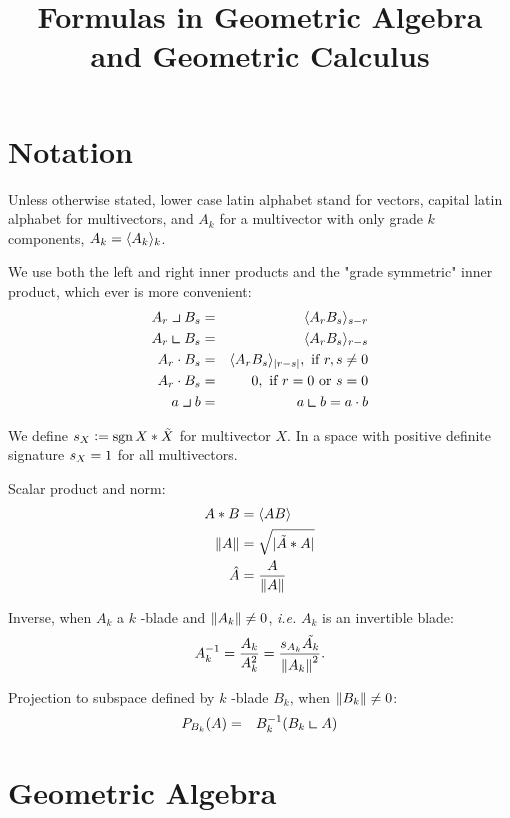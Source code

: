 \documentclass[a4paper,12pt]{article}
\title{Formulas in Geometric Algebra and Geometric Calculus}
\author{}
\begin{document}
\maketitle

\section{Notation}

Unless otherwise stated, lower case latin alphabet stand for vectors, capital latin alphabet for multivectors, and $A_k$ for a multivector with only grade $k$ components, $A_k = \grade{k}{A_k}$.

We use both the left and right inner products and the "grade symmetric" inner product, which ever is more convenient:
\begin{eqnarray}
A_r \linner B_s &=& \grade{s-r}{A_r B_s}\\
A_r \rinner B_s &=& \grade{r-s}{A_r B_s}\\
A_r \cdot B_s &=& \grade{\abs{r-s}}{A_r B_s},\ \textrm{if}\ r, s \neq 0\\
A_r \cdot B_s &=& 0,\ \textrm{if}\ r = 0\ \textrm{or}\ s = 0\\
a \linner b &=& a \rinner b = a \cdot b
\end{eqnarray}

We define $\signX{X} := \sign{X * \reverse{X}}$ for multivector $X$.
In a space with positive definite signature $\signX{X} = 1$ for all multivectors.

Scalar product and norm:
\begin{align}
 A * B &= \grade{}{AB}\\
 \norm{A} &= \sqrt{|\reverse{A} * A|}\\
 \normed{A} &= \frac{A}{\norm{A}}
\end{align}

Inverse, when $A_k$ a $k$ -blade and $\norm{A_k} \neq 0$, \emph{i.e.} $A_k$ is an invertible blade:
\begin{equation}
\label{eq:inversedef}
A_k^{-1} = \frac{A_k}{A_k^2} = \frac{\signX{A_k}\reverse{A_k}}{\norm{A_k}^2}.
\end{equation}

Projection to subspace defined by $k$ -blade $B_k$, when $\norm{B_k} \neq 0$:
\begin{eqnarray}
\label{eq:projdef}
 P_{B_k}(A) &=& B^{-1}_{k}(B_k \rinner A)
\end{eqnarray}

\section{Geometric Algebra}
\end{document}
